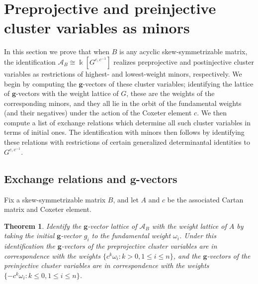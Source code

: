 \documentclass[12pt]{amsart}
\newcommand{\cA}{\mathcal{A}}
\newcommand{\kk}{\Bbbk}%
\newcommand{\bfg}{\mathbf{g}}
\newtheorem{theorem}{Theorem}[section]
\theoremstyle{remark}
\numberwithin{equation}{section}
\begin{document}
\section{Preprojective and preinjective cluster variables as minors}
In this section we prove that when $B$ is any acyclic skew-symmetrizable matrix, the identification $\cA_B \cong \kk[G^{c,c^{-1}}]$ realizes preprojective and postinjective cluster variables as restrictions of highest- and lowest-weight minors, respectively. We begin by computing the $\bfg$-vectors of these cluster variables; identifying the lattice of $\bfg$-vectors with the weight lattice of $G$, these are the weights of the corresponding minors, and they all lie in the orbit of the fundamental weights (and their negatives) under the action of the Coxeter element $c$. We then compute a list of exchange relations which determine all such cluster variables in terms of initial ones. The identification with minors then follows by identifying these relations with restrictions of certain generalized determinantal identities to $G^{c,c^{-1}}$.

\subsection{Exchange relations and $\bfg$-vectors}

Fix a skew-symmetrizable matrix $B$, and let $A$ and $c$ be the associated Cartan matrix and Coxeter element.

\begin{theorem}
Identify the $\bfg$-vector lattice of $\cA_B$ with the weight lattice of $A$ by taking the initial $\bfg$-vector $g_i$ to the fundamental weight $\omega_i$. Under this identification the $\bfg$-vectors of the preprojective cluster variables are in correspondence with the weights $\{c^k\omega_i : k > 0, 1 \leq i \leq n\}$, and the $\bfg$-vectors of the preinjective cluster variables are in correspondence with the weights $\{-c^k\omega_i : k \leq 0, 1 \leq i \leq n\}$.
\end{theorem}
\end{document}
